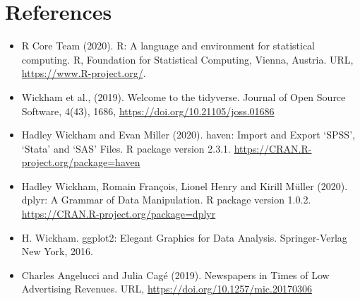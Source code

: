 \documentclass[
]{article}
\begin{document}
\hypertarget{references}{%
\section{References}\label{references}}

\begin{itemize}
\item
  R Core Team (2020). R: A language and environment for statistical computing. R, Foundation for Statistical Computing, Vienna, Austria. URL, \url{https://www.R-project.org/}.
\item
  Wickham et al., (2019). Welcome to the tidyverse. Journal of Open Source Software, 4(43), 1686, \url{https://doi.org/10.21105/joss.01686}
\item
  Hadley Wickham and Evan Miller (2020). haven: Import and Export `SPSS', `Stata' and `SAS' Files. R package
  version 2.3.1. \url{https://CRAN.R-project.org/package=haven}
\item
  Hadley Wickham, Romain François, Lionel Henry and Kirill Müller (2020). dplyr: A Grammar of Data
  Manipulation. R package version 1.0.2. \url{https://CRAN.R-project.org/package=dplyr}
\item
  H. Wickham. ggplot2: Elegant Graphics for Data Analysis. Springer-Verlag New York, 2016.
\item
  Charles Angelucci and Julia Cagé (2019). Newspapers in Times of Low Advertising Revenues. URL, \url{https://doi.org/10.1257/mic.20170306}
\end{itemize}
\end{document}
